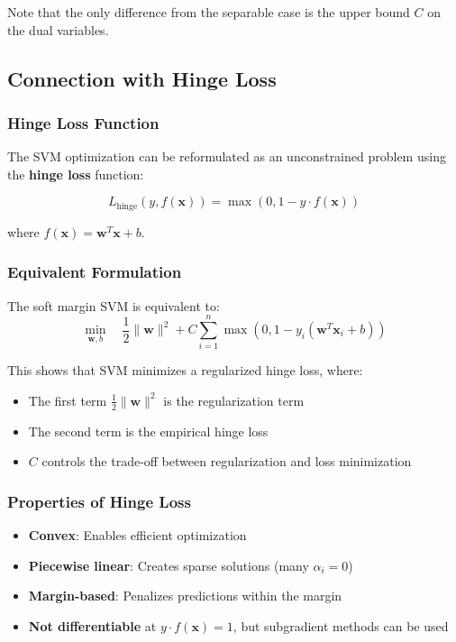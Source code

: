 \documentclass[12pt,a4paper]{article}
\begin{document}
Note that the only difference from the separable case is the upper bound $C$ on the dual variables.

\subsection{Connection with Hinge Loss}

\subsubsection{Hinge Loss Function}
The SVM optimization can be reformulated as an unconstrained problem using the \textbf{hinge loss} function:

\begin{equation}
L_{\text{hinge}}(y, f(\mathbf{x})) = \max(0, 1 - y \cdot f(\mathbf{x}))
\end{equation}

where $f(\mathbf{x}) = \mathbf{w}^T\mathbf{x} + b$.

\subsubsection{Equivalent Formulation}
The soft margin SVM is equivalent to:
\begin{equation}
\min_{\mathbf{w}, b} \quad \frac{1}{2}\|\mathbf{w}\|^2 + C\sum_{i=1}^n \max(0, 1 - y_i(\mathbf{w}^T\mathbf{x}_i + b))
\end{equation}

This shows that SVM minimizes a regularized hinge loss, where:
\begin{itemize}
    \item The first term $\frac{1}{2}\|\mathbf{w}\|^2$ is the regularization term
    \item The second term is the empirical hinge loss
    \item $C$ controls the trade-off between regularization and loss minimization
\end{itemize}

\subsubsection{Properties of Hinge Loss}
\begin{itemize}
    \item \textbf{Convex}: Enables efficient optimization
    \item \textbf{Piecewise linear}: Creates sparse solutions (many $\alpha_i = 0$)
    \item \textbf{Margin-based}: Penalizes predictions within the margin
    \item \textbf{Not differentiable} at $y \cdot f(\mathbf{x}) = 1$, but subgradient methods can be used
\end{itemize}
\end{document}
